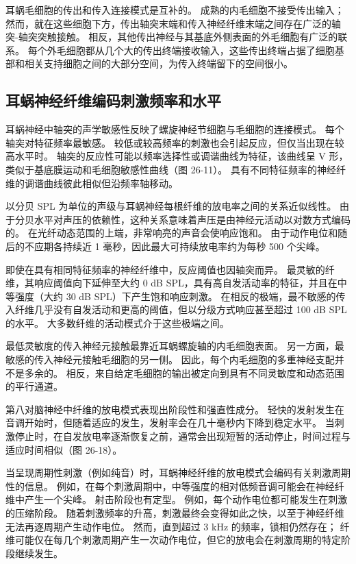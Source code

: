耳蜗毛细胞的传出和传入连接模式是互补的。 成熟的内毛细胞不接受传出输入； 然而，就在这些细胞下方，传出轴突末端和传入神经纤维末端之间存在广泛的轴突-轴突突触接触。 相反，其他传出神经与其基底外侧表面的外毛细胞有广泛的联系。 每个外毛细胞都从几个大的传出终端接收输入，这些传出终端占据了细胞基部和相关支持细胞之间的大部分空间，为传入终端留下的空间很小。



\subsection{耳蜗神经纤维编码刺激频率和水平}
耳蜗神经中轴突的声学敏感性反映了螺旋神经节细胞与毛细胞的连接模式。 每个轴突对特征频率最敏感。 较低或较高频率的刺激也会引起反应，但仅当出现在较高水平时。 轴突的反应性可能以频率选择性或调谐曲线为特征，该曲线呈 V 形，类似于基底膜运动和毛细胞敏感性曲线（图 26-11）。 具有不同特征频率的神经纤维的调谐曲线彼此相似但沿频率轴移动。

以分贝 SPL 为单位的声级与耳蜗神经每根纤维的放电率之间的关系近似线性。 由于分贝水平对声压的依赖性，这种关系意味着声压是由神经元活动以对数方式编码的。 在光纤动态范围的上端，非常响亮的声音会使响应饱和。 由于动作电位和随后的不应期各持续近 1 毫秒，因此最大可持续放电率约为每秒 500 个尖峰。

即使在具有相同特征频率的神经纤维中，反应阈值也因轴突而异。 最灵敏的纤维，其响应阈值向下延伸至大约 0 dB SPL，具有高自发活动率的特征，并且在中等强度（大约 30 dB SPL）下产生饱和响应刺激。 在相反的极端，最不敏感的传入纤维几乎没有自发活动和更高的阈值，但以分级方式响应甚至超过 100 dB SPL 的水平。 大多数纤维的活动模式介于这些极端之间。

最低灵敏度的传入神经元接触最靠近耳蜗螺旋轴的内毛细胞表面。 另一方面，最敏感的传入神经元接触毛细胞的另一侧。 因此，每个内毛细胞的多重神经支配并不是多余的。 相反，来自给定毛细胞的输出被定向到具有不同灵敏度和动态范围的平行通道。

第八对脑神经中纤维的放电模式表现出阶段性和强直性成分。 轻快的发射发生在音调开始时，但随着适应的发生，发射率会在几十毫秒内下降到稳定水平。 当刺激停止时，在自发放电率逐渐恢复之前，通常会出现短暂的活动停止，时间过程与适应时间相似（图 26-18）。

当呈现周期性刺激（例如纯音）时，耳蜗神经纤维的放电模式会编码有关刺激周期性的信息。 例如，在每个刺激周期中，中等强度的相对低频音调可能会在神经纤维中产生一个尖峰。 射击阶段也有定型。 例如，每个动作电位都可能发生在刺激的压缩阶段。 随着刺激频率的升高，刺激最终会变得如此之快，以至于神经纤维无法再逐周期产生动作电位。 然而，直到超过 3 kHz 的频率，锁相仍然存在； 纤维可能仅在每几个刺激周期产生一次动作电位，但它的放电会在刺激周期的特定阶段继续发生。

